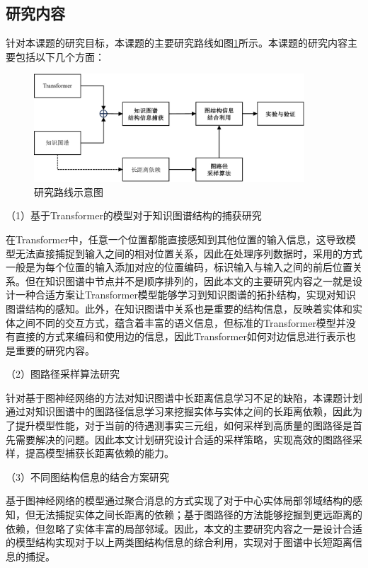\subsection{研究内容}


针对本课题的研究目标，本课题的主要研究路线如图\ref{research_route}所示。本课题的研究内容主要包括以下几个方面：

\begin{figure}[htb]
  \centerline{\includegraphics[width=0.9\textwidth]{pic/research_route_2.pdf}}
  \caption{研究路线示意图}
  \label{research_route}
\end{figure}

（1）基于Transformer的模型对于知识图谱结构的捕获研究

在Transformer中，任意一个位置都能直接感知到其他位置的输入信息，这导致模型无法直接捕捉到输入之间的相对位置关系，因此在处理序列数据时，采用的方式一般是为每个位置的输入添加对应的位置编码，标识输入与输入之间的前后位置关系。但在知识图谱中节点并不是顺序排列的，因此本文的主要研究内容之一就是设计一种合适方案让Transformer模型能够学习到知识图谱的拓扑结构，实现对知识图谱结构的感知。此外，在知识图谱中关系也是重要的结构信息，反映着实体和实体之间不同的交互方式，蕴含着丰富的语义信息，但标准的Transformer模型并没有直接的方式来编码和使用边的信息，因此Transformer如何对边信息进行表示也是重要的研究内容。

（2）图路径采样算法研究

针对基于图神经网络的方法对知识图谱中长距离信息学习不足的缺陷，本课题计划通过对知识图谱中的图路径信息学习来挖掘实体与实体之间的长距离依赖，因此为了提升模型性能，对于当前的待遇测事实三元组，如何采样到高质量的图路径是首先需要解决的问题。因此本文计划研究设计合适的采样策略，实现高效的图路径采样，提高模型捕获长距离依赖的能力。

（3）不同图结构信息的结合方案研究

基于图神经网络的模型通过聚合消息的方式实现了对于中心实体局部邻域结构的感知，但无法捕捉实体之间长距离的依赖；基于图路径的方法能够挖掘到更远距离的依赖，但忽略了实体丰富的局部邻域。因此，本文的主要研究内容之一是设计合适的模型结构实现对于以上两类图结构信息的综合利用，实现对于图谱中长短距离信息的捕捉。

